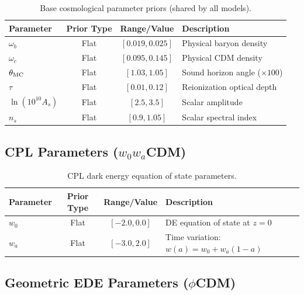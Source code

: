 \documentclass[a4paper,11pt]{article}
\begin{document}
\begin{table}[h]
\centering
\caption{Base cosmological parameter priors (shared by all models).}
\label{tab:base_priors}
\begin{tabular}{lccl}
\toprule
Parameter & Prior Type & Range/Value & Description \\
\midrule
$\omega_b$ & Flat & $[0.019, 0.025]$ & Physical baryon density \\
$\omega_c$ & Flat & $[0.095, 0.145]$ & Physical CDM density \\
$\theta_{\rm MC}$ & Flat & $[1.03, 1.05]$ & Sound horizon angle ($\times 100$) \\
$\tau$ & Flat & $[0.01, 0.12]$ & Reionization optical depth \\
$\ln(10^{10}A_s)$ & Flat & $[2.5, 3.5]$ & Scalar amplitude \\
$n_s$ & Flat & $[0.9, 1.05]$ & Scalar spectral index \\
\bottomrule
\end{tabular}
\end{table}

\subsection{CPL Parameters ($w_0w_a$CDM)}

\begin{table}[h]
\centering
\caption{CPL dark energy equation of state parameters.}
\label{tab:cpl_priors}
\begin{tabular}{lccl}
\toprule
Parameter & Prior Type & Range/Value & Description \\
\midrule
$w_0$ & Flat & $[-2.0, 0.0]$ & DE equation of state at $z=0$ \\
$w_a$ & Flat & $[-3.0, 2.0]$ & Time variation: $w(a) = w_0 + w_a(1-a)$ \\
\bottomrule
\end{tabular}
\end{table}

\subsection{Geometric EDE Parameters ($\phi$CDM)}
\end{document}
